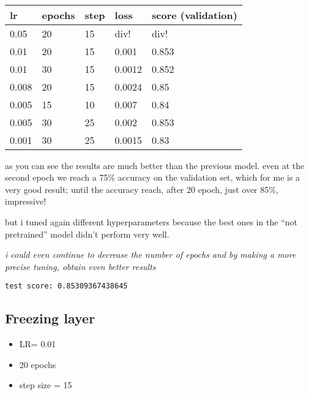 \documentclass[11pt]{article}
\providecommand{\tightlist}{%
      \setlength{\itemsep}{0pt}\setlength{\parskip}{0pt}}
\begin{document}
    

    
    \begin{center}
    \end{center}
    { \hspace*{\fill} \\}
    
    


    
    \begin{longtable}[]{@{}lllll@{}}
\toprule
lr & epochs & step & loss & score (validation)\tabularnewline
\midrule
\endhead
0.05 & 20 & 15 & div! & div!\tabularnewline
0.01 & 20 & 15 & 0.001 & 0.853\tabularnewline
0.01 & 30 & 15 & 0.0012 & 0.852\tabularnewline
0.008 & 20 & 15 & 0.0024 & 0.85\tabularnewline
0.005 & 15 & 10 & 0.007 & 0.84\tabularnewline
0.005 & 30 & 25 & 0.002 & 0.853\tabularnewline
0.001 & 30 & 25 & 0.0015 & 0.83\tabularnewline
\bottomrule
\end{longtable}

as you can see the results are much better than the previous model. even
at the second epoch we reach a 75\% accuracy on the validation set,
which for me is a very good result; until the accuracy reach, after 20
epoch, just over 85\%, impressive!

but i tuned again different hyperparameters because the best ones in the
``not pretrained'' model didn't perform very well.

\emph{i could even continue to decrease the number of epochs and by
making a more precise tuning, obtain even better results}

    \begin{Verbatim}[commandchars=\\\{\}]
 test score: 0.85309367438645
 \end{Verbatim}

    \hypertarget{freezing-layer}{%
\subsection{\texorpdfstring{\textbf{Freezing
layer}}{Freezing layer}}\label{freezing-layer}}

\begin{itemize}
\tightlist
\item
  LR= 0.01
\item
  20 epochs
\item
  step size = 15
\end{itemize}
\end{document}

